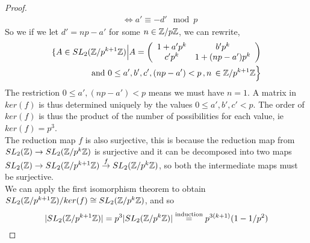 \begin{proof}
\begin{align*}
             & \iff a' \equiv -d' \mod p
\end{align*}
So we if we let $d' = np -a'$ for some $n \in \znz[p]$, we can rewrite,
\begin{align*}
\lbrace A \in \sltznz[p^{k+1}]  \Big \vert A = \left(
      \begin{array}{ c c }
         1+a'p^k & b'p^k \\
         c'p^k &  1+(np- a')p^k 
      \end{array} \right) \\
       \text{ and } 0 \leq a',b',c', (np -a') < p\,, n\, \in \mathbb{Z}/p^{k+1}\mathbb{Z} \Big \rbrace
\end{align*}  
The restriction $0\leq a',(np - a') < p$ means we must have $n =1$. A matrix in $ker(f)$ is thus determined uniquely by the values $0 \leq a',b',c' < p$. The order of $ker(f)$ is thus the product of the number of possibilities for each value, ie $ker(f) = p^3$.\\ 
The reduction map $f$ is also surjective, this is because the reduction map from $\sltz \rightarrow \sltznz[p^k] $ is surjective and it can be decomposed into two maps $\sltz \rightarrow \sltznz[p^{k+1}]   \overset{f}{\rightarrow} \sltznz[p^k] $, so both the intermediate maps must be surjective.\\ 
We can apply the first isomorphism theorem to obtain $\sltznz[p^{k+1}] /ker(f) \cong \sltznz[p^k] $, and so
$$\vert \sltznz[p^{k+1}] \vert  = p^3 \vert \sltznz[p^k] \vert  \stackrel{\text{induction}}{=} p^{3(k+1)}(1 - 1/p^2)$$
\end{proof}


